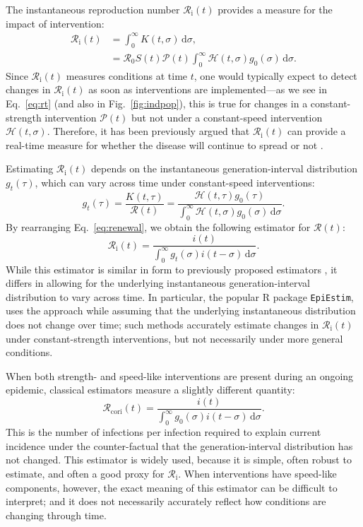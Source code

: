 \documentclass[12pt]{article}
\newcommand{\eref}[1]{Eq.~\ref{eq:#1}}
\newcommand{\fref}[1]{Fig.~\ref{fig:#1}}
\newcommand{\Rx}[1]{\ensuremath{{\mathcal R}_{#1}}\xspace}
\newcommand{\Ri}{\Rx{\mathrm{i}}}
\newcommand{\RR}{\ensuremath{{\mathcal R}}\xspace}
\newcommand{\Rcori}{\Rx{\mathrm{cori}}}
\newcommand{\dd}[1]{\ensuremath{\, \mathrm{d}#1}}
\newcommand{\dsigma}{\dd{\sigma}}
\newcommand{\PP}{\ensuremath{\mathcal P}}
\newcommand{\HH}{\ensuremath{\mathcal H}}
\begin{document}
The instantaneous reproduction number $\Ri(t)$ provides a measure for the impact of intervention:
\begin{align}
\Ri(t) &= \int_0^\infty K(t, \sigma) \dsigma, \\
&= \RR_0 S(t) \PP(t) \int_0^\infty \HH(t,\sigma) g_0(\sigma) \dsigma.
\label{eq:rt}
\end{align}
Since $\Ri(t)$ measures conditions at time $t$, one would typically expect to detect changes in $\Ri(t)$ as soon as interventions are implemented---as we see in \eref{rt} (and also in \fref{indpop}), this is true for changes in a constant-strength intervention $\PP(t)$ but not under a constant-speed intervention $\HH(t, \sigma)$.
Therefore, it has been previously argued that $\Ri(t)$ can provide a real-time measure for whether the disease will continue to spread or not \citep{gostic2020practical}.

Estimating $\Ri(t)$ depends on the instantaneous generation-interval distribution $g_t(\tau)$,
which can vary across time under constant-speed interventions:
\begin{equation}
g_t(\tau) = \frac{K(t, \tau)}{\RR(t)} = \frac{\HH(t,\tau) g_0(\tau)}{\int_0^\infty \HH(t,\sigma) g_0(\sigma) \dsigma}.
\end{equation}
By rearranging \eref{renewal}, we obtain the following estimator for $\RR(t)$:
\begin{equation}
\Ri(t) = \frac{i(t)}{\int_0^\infty g_t(\sigma) i(t-\sigma) \dsigma}.
\end{equation}
While this estimator is similar in form to previously proposed estimators \citep{fraser2007estimating}, it differs in allowing for the underlying instantaneous generation-interval distribution to vary across time.
In particular, the popular R package \texttt{EpiEstim}, \cite{cori2013new} uses the approach while assuming that the underlying instantaneous distribution does not change over time; 
such methods accurately estimate changes in $\Ri(t)$ under constant-strength interventions, but not necessarily under more general conditions.

When both strength- and speed-like interventions are present during an ongoing epidemic, classical estimators \cite{fraser2007estimating,cori2013new} measure a slightly different quantity:
\begin{equation}
\Rcori(t) = \frac{i(t)}{\int_0^\infty g_0(\sigma) i(t-\sigma) \dsigma}.
\end{equation}
This is the number of infections per infection required to explain current incidence under the counter-factual that the generation-interval distribution has not changed.
This estimator is widely used, because it is simple, often robust to estimate, and often a good proxy for \Ri.
When interventions have speed-like components, however, the exact meaning of this estimator can be difficult to interpret; 
and it does not necessarily accurately reflect how conditions are changing through time.
\end{document}

